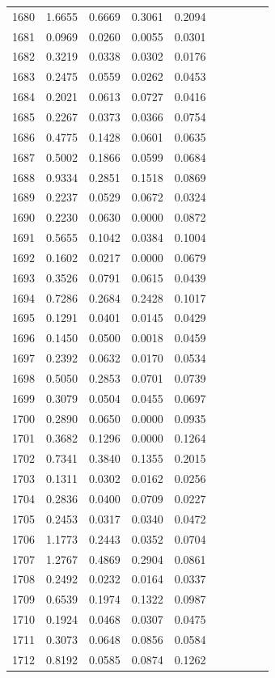 \begin{table}
\begin{tabular}{cccccccccc}
1680& 1.6655& 0.6669& 0.3061& 0.2094\\ 
1681& 0.0969& 0.0260& 0.0055& 0.0301\\ 
1682& 0.3219& 0.0338& 0.0302& 0.0176\\ 
1683& 0.2475& 0.0559& 0.0262& 0.0453\\ 
1684& 0.2021& 0.0613& 0.0727& 0.0416\\ 
1685& 0.2267& 0.0373& 0.0366& 0.0754\\ 
1686& 0.4775& 0.1428& 0.0601& 0.0635\\ 
1687& 0.5002& 0.1866& 0.0599& 0.0684\\ 
1688& 0.9334& 0.2851& 0.1518& 0.0869\\ 
1689& 0.2237& 0.0529& 0.0672& 0.0324\\ 
1690& 0.2230& 0.0630& 0.0000& 0.0872\\ 
1691& 0.5655& 0.1042& 0.0384& 0.1004\\ 
1692& 0.1602& 0.0217& 0.0000& 0.0679\\ 
1693& 0.3526& 0.0791& 0.0615& 0.0439\\ 
1694& 0.7286& 0.2684& 0.2428& 0.1017\\ 
1695& 0.1291& 0.0401& 0.0145& 0.0429\\ 
1696& 0.1450& 0.0500& 0.0018& 0.0459\\ 
1697& 0.2392& 0.0632& 0.0170& 0.0534\\ 
1698& 0.5050& 0.2853& 0.0701& 0.0739\\ 
1699& 0.3079& 0.0504& 0.0455& 0.0697\\ 
1700& 0.2890& 0.0650& 0.0000& 0.0935\\ 
1701& 0.3682& 0.1296& 0.0000& 0.1264\\ 
1702& 0.7341& 0.3840& 0.1355& 0.2015\\ 
1703& 0.1311& 0.0302& 0.0162& 0.0256\\ 
1704& 0.2836& 0.0400& 0.0709& 0.0227\\ 
1705& 0.2453& 0.0317& 0.0340& 0.0472\\ 
1706& 1.1773& 0.2443& 0.0352& 0.0704\\ 
1707& 1.2767& 0.4869& 0.2904& 0.0861\\ 
1708& 0.2492& 0.0232& 0.0164& 0.0337\\ 
1709& 0.6539& 0.1974& 0.1322& 0.0987\\ 
1710& 0.1924& 0.0468& 0.0307& 0.0475\\ 
1711& 0.3073& 0.0648& 0.0856& 0.0584\\ 
1712& 0.8192& 0.0585& 0.0874& 0.1262\\ 

\end{tabular}
\end{table}
